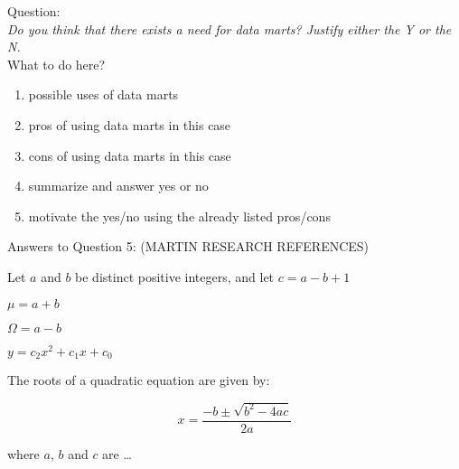 Question:\\
\emph{
    Do you think that there exists a need for data marts? Justify either the Y or the N.
}\\

What to do here?
\begin{enumerate}
    \item possible uses of data marts
    \item pros of using data marts in this case
    \item cons of using data marts in this case
    \item summarize and answer yes or no
    \item motivate the yes/no using the already listed pros/cons
  \end{enumerate}

\newpage Answers to Question 5: (MARTIN RESEARCH REFERENCES)

\newpage 
Let $a$ and $b$ be distinct positive integers, and let $c = a - b + 1$

$\mu = a + b $


$\Omega = a - b $

$y = c_2 x^2 + c_1 x + c_0 $

The roots of a quadratic equation are given by:

\begin{equation}
x = \frac{-b \pm \sqrt{b^2 - 4ac}} {2a}
\end{equation}

where $a$, $b$ and $c$ are \ldots

